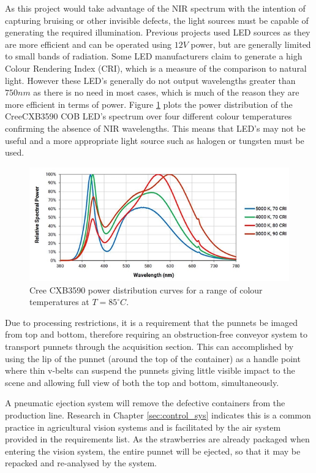 \documentclass[fleqn,twoside,12pt]{report}
\begin{document}
As this project would take advantage of the NIR spectrum with the intention of capturing bruising or other invisible defects, the light sources must be capable of generating the required illumination. Previous projects used LED sources as they are more efficient and can be operated using $12V$ power, but are generally limited to small bands of radiation. Some LED manufacturers claim to generate a high Colour Rendering Index (CRI), which is a measure of the comparison to natural light. However these LED's generally do not output wavelengths greater than $750nm$ as there is no need in most cases, which is much of the reason they are more efficient in terms of power. Figure \ref{fig:LED_response} plots the power distribution of the Cree\textregistered CXB3590 COB LED's spectrum over four different colour temperatures confirming the absence of NIR wavelengths. This means that LED's may not be useful and a more appropriate light source such as halogen or tungsten must be used.


\begin{figure}[h]
	\centering
	\includegraphics[width=.9\linewidth]{LED_response.png}
	\caption{Cree CXB3590 power distribution curves for a range of colour temperatures at $T=85^{\circ}C$.}
	\label{fig:LED_response}
\end{figure}%


Due to processing restrictions, it is a requirement that the punnets be imaged from top and bottom, therefore requiring an obstruction-free conveyor system to transport punnets through the acquisition section. This can accomplished by using the lip of the punnet (around the top of the container) as a handle point where thin v-belts can suspend the punnets giving little visible impact to the scene and allowing full view of both the top and bottom, simultaneously.

A pneumatic ejection system will remove the defective containers from the production line. Research in Chapter \ref{sec:control_sys} indicates this is a common practice in agricultural vision systems and is facilitated by the air system provided in the requirements list. As the strawberries are already packaged when entering the vision system, the entire punnet will be ejected, so that it may be repacked and re-analysed by the system.
\end{document}
